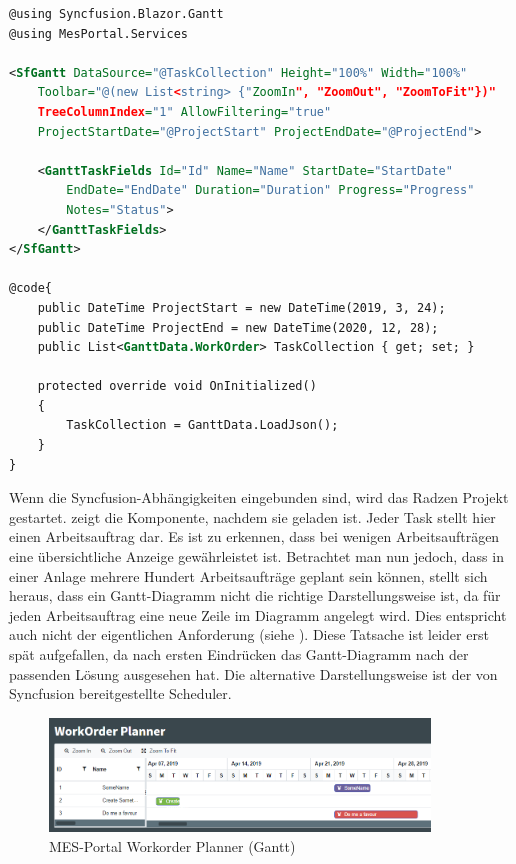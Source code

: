 \begin{lstlisting}[language={XML},
frame=single,
framexleftmargin=15pt,
style=algoBericht,
label={listing_gantt-component},
captionpos=b,
caption={Custom Gantt Component}]
@using Syncfusion.Blazor.Gantt
@using MesPortal.Services

<SfGantt DataSource="@TaskCollection" Height="100%" Width="100%"
    Toolbar="@(new List<string> {"ZoomIn", "ZoomOut", "ZoomToFit"})"
    TreeColumnIndex="1" AllowFiltering="true"
    ProjectStartDate="@ProjectStart" ProjectEndDate="@ProjectEnd">

    <GanttTaskFields Id="Id" Name="Name" StartDate="StartDate"
        EndDate="EndDate" Duration="Duration" Progress="Progress"
        Notes="Status">
    </GanttTaskFields>
</SfGantt>

@code{
    public DateTime ProjectStart = new DateTime(2019, 3, 24);
    public DateTime ProjectEnd = new DateTime(2020, 12, 28);
    public List<GanttData.WorkOrder> TaskCollection { get; set; }

    protected override void OnInitialized()
    {
        TaskCollection = GanttData.LoadJson();
    }
}
\end{lstlisting}

\noindent Wenn die Syncfusion-Abhängigkeiten eingebunden sind, wird das Radzen Projekt gestartet.  zeigt die Komponente, nachdem sie geladen ist. Jeder Task stellt hier einen Arbeitsauftrag dar. Es ist zu erkennen, dass bei wenigen Arbeitsaufträgen eine übersichtliche Anzeige gewährleistet ist. Betrachtet man nun jedoch, dass in einer Anlage mehrere Hundert Arbeitsaufträge geplant sein können, stellt sich heraus, dass ein Gantt-Diagramm nicht die richtige Darstellungsweise ist, da für jeden Arbeitsauftrag eine neue Zeile im Diagramm angelegt wird. Dies entspricht auch nicht der eigentlichen Anforderung (siehe ). Diese Tatsache ist leider erst spät aufgefallen, da nach ersten Eindrücken das Gantt-Diagramm nach der passenden Lösung ausgesehen hat. Die alternative Darstellungsweise ist der von Syncfusion bereitgestellte Scheduler.

\begin{figure}[htbp]
  \centering
  \includegraphics[width=0.9\textwidth]{img/wo_planner-gantt}
  \caption{\label{fig-wo_planner_gantt}MES-Portal Workorder Planner (Gantt)}
\end{figure}

